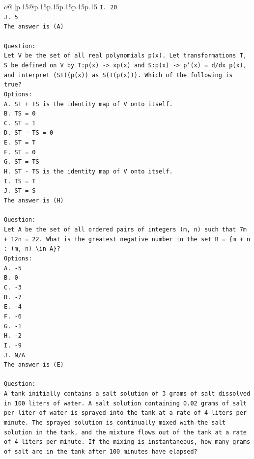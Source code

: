 \documentclass{article}
\begin{document}
{\begin{supertabular}{c@{$\;$}|p{.15\linewidth}@{}p{.15\linewidth}p{.15\linewidth}p{.15\linewidth}p{.15\linewidth}p{.15\linewidth}}
{{{\texttt{I. 20} \\
\texttt{J. 5} \\
\texttt{The answer is (A)} \\
\\ 
\texttt{Question:} \\
\texttt{Let V be the set of all real polynomials p(x). Let transformations T, S be defined on V by T:p(x) {-}> xp(x) and S:p(x) {-}> p'(x) = d/dx p(x), and interpret (ST)(p(x)) as S(T(p(x))). Which of the following is true?} \\
\texttt{Options:} \\
\texttt{A. ST + TS is the identity map of V onto itself.} \\
\texttt{B. TS = 0} \\
\texttt{C. ST = 1} \\
\texttt{D. ST {-} TS = 0} \\
\texttt{E. ST = T} \\
\texttt{F. ST = 0} \\
\texttt{G. ST = TS} \\
\texttt{H. ST {-} TS is the identity map of V onto itself.} \\
\texttt{I. TS = T} \\
\texttt{J. ST = S} \\
\texttt{The answer is (H)} \\
\\ 
\texttt{Question:} \\
\texttt{Let A be the set of all ordered pairs of integers (m, n) such that 7m + 12n = 22. What is the greatest negative number in the set B = \{m + n : (m, n) \textbackslash{}in A\}?} \\
\texttt{Options:} \\
\texttt{A. {-}5} \\
\texttt{B. 0} \\
\texttt{C. {-}3} \\
\texttt{D. {-}7} \\
\texttt{E. {-}4} \\
\texttt{F. {-}6} \\
\texttt{G. {-}1} \\
\texttt{H. {-}2} \\
\texttt{I. {-}9} \\
\texttt{J. N/A} \\
\texttt{The answer is (E)} \\
\\ 
\texttt{Question:} \\
\texttt{A tank initially contains a salt solution of 3 grams of salt dissolved in 100 liters of water. A salt solution containing 0.02 grams of salt per liter of water is sprayed into the tank at a rate of 4 liters per minute. The sprayed solution is continually mixed with the salt solution in the tank, and the mixture flows out of the tank at a rate of 4 liters per minute. If the mixing is instantaneous, how many grams of salt are in the tank after 100 minutes have elapsed?} \\
}}}
\end{supertabular}}
\end{document}
